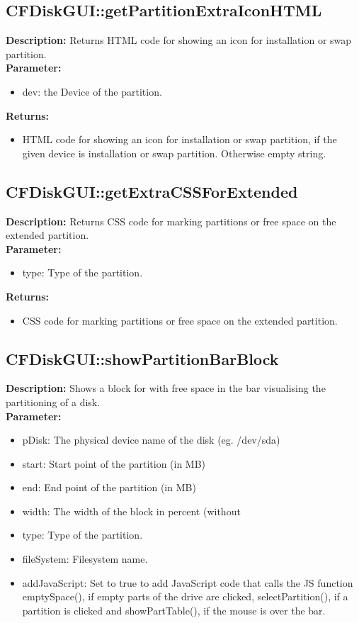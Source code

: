 \subsection{CFDiskGUI::getPartitionExtraIconHTML}
\textbf{Description:} Returns HTML code for showing an icon for installation or swap partition.\\
\textbf{Parameter:}
\begin{itemize}
\item dev: the Device of the partition.
\end{itemize}
\textbf{Returns:}
\begin{itemize}
\item HTML code for showing an icon for installation or swap partition, if the given device is installation or swap partition. Otherwise empty string.
\end{itemize}

\subsection{CFDiskGUI::getExtraCSSForExtended}
\textbf{Description:} Returns CSS code for marking partitions or free space on the extended partition.\\
\textbf{Parameter:}
\begin{itemize}
\item type: Type of the partition.
\end{itemize}
\textbf{Returns:}
\begin{itemize}
\item CSS code for marking partitions or free space on the extended partition.
\end{itemize}

\subsection{CFDiskGUI::showPartitionBarBlock}
\textbf{Description:} Shows a block for with free space in the bar visualising the partitioning of a disk.\\
\textbf{Parameter:}
\begin{itemize}
\item pDisk: The physical device name of the disk (eg. /dev/sda)
\item start: Start point of the partition (in MB)
\item end: End point of the partition (in MB)
\item width: The width of the block in percent (without %
\item type: Type of the partition.
\item fileSystem: Filesystem name.
\item addJavaScript: Set to true to add JavaScript code that calls the JS function emptySpace(), if empty parts of the drive are clicked, selectPartition(), if a partition is clicked and showPartTable(), if the mouse is over the bar.
\end{itemize}

